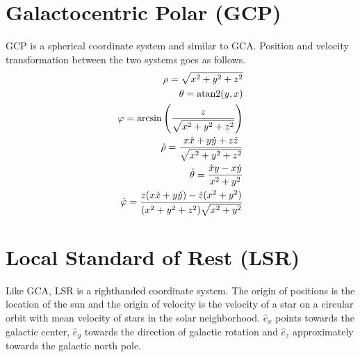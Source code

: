 \documentclass[letterpaper,10pt,english]{sphinxmanual}
\begin{document}
\section{Galactocentric Polar (GCP)}
\label{\detokenize{NBodySimulation/CoordinateSystems:galactocentric-polar-gcp}}
\sphinxAtStartPar
GCP is a spherical coordinate system and similar to GCA.
Position and velocity transformation between the two systems goes as follows.
\begin{equation}\label{equation:NBodySimulation/CoordinateSystems:GCA_to_GCP}
\begin{split}\rho  = \sqrt{x^2+y^2+z^2} \\
\theta = \textup{atan2}{\left ( y,x \right )}\\
\varphi  = \arcsin\left ( \frac{z}{\sqrt{x^2+y^2+z^2}} \right ) \\
\dot{\rho} =  \frac{x\dot{x}+y\dot{y}+z\dot{z}}{\sqrt{x^2+y^2+z^2}}\\
\dot{\theta} = \frac{\dot{x}y-x\dot{y}}{x^2+y^2} \\
\dot{\varphi} = \frac{z(x\dot{x}+y\dot{y})-\dot{z}(x^2+y^2)}{(x^2+y^2+z^2)\sqrt{x^2+y^2}}\end{split}
\end{equation}

\section{Local Standard of Rest (LSR)}
\label{\detokenize{NBodySimulation/CoordinateSystems:local-standard-of-rest-lsr}}
\sphinxAtStartPar
Like GCA, LSR is a right\sphinxhyphen{}handed coordinate system.
The origin of positions is the location of the sun
and the origin of velocity is the velocity of a star on a circular orbit with mean velocity of stars in the solar neighborhood.
\(\hat{e}_x\) points towards the galactic center, \(\hat{e}_y\) towards the direction of galactic rotation
and \(\hat{e}_z\) approximately towards the galactic north pole.
\end{document}
